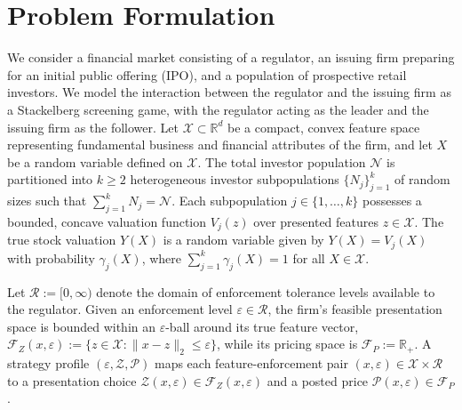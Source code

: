 \section{Problem Formulation}
\label{sec:model}

We consider a financial market consisting of a regulator, an issuing firm preparing for an initial public offering (IPO), and a population of prospective retail investors. We model the interaction between the regulator and the issuing firm as a Stackelberg screening game, with the regulator acting as the leader and the issuing firm as the follower. Let $\mathcal{X} \subset \mathbb{R}^d$ be a compact, convex feature space representing fundamental business and financial attributes of the firm, and let $X$ be a random variable defined on $\mathcal{X}$. The total investor population $\mathcal{N}$ is partitioned into $k \ge 2$ heterogeneous investor subpopulations $\{N_j\}_{j=1}^k$ of random sizes such that $\sum_{j=1}^k N_j = \mathcal{N}$. Each subpopulation $j \in \{1, \dots, k\}$ possesses a bounded, concave valuation function $V_j(z)$ over presented features $z \in \mathcal{X}$. The true stock valuation $Y(X)$ is a random variable given by $Y(X) = V_j(X)$ with probability $\gamma_j(X)$, where $\sum_{j=1}^k \gamma_j(X) = 1$ for all $X \in \mathcal{X}$.


Let $\mathcal{R} := [0, \infty)$ denote the domain of enforcement tolerance levels available to the regulator. Given an enforcement level $\varepsilon \in \mathcal{R}$, the firm's feasible presentation space is bounded within an $\varepsilon$-ball around its true feature vector, $\mathcal{F}_Z(x, \varepsilon) := \{z \in \mathcal{X} : \|x - z\|_2 \le \varepsilon\}$, while its pricing space is $\mathcal{F}_P := \mathbb{R}_+$. A strategy profile $(\varepsilon, \mathcal{Z}, \mathcal{P})$ maps each feature-enforcement pair $(x, \varepsilon) \in \mathcal{X} \times \mathcal{R}$ to a presentation choice $\mathcal{Z}(x, \varepsilon) \in \mathcal{F}_Z(x, \varepsilon)$ and a posted price $\mathcal{P}(x, \varepsilon) \in \mathcal{F}_P$.

